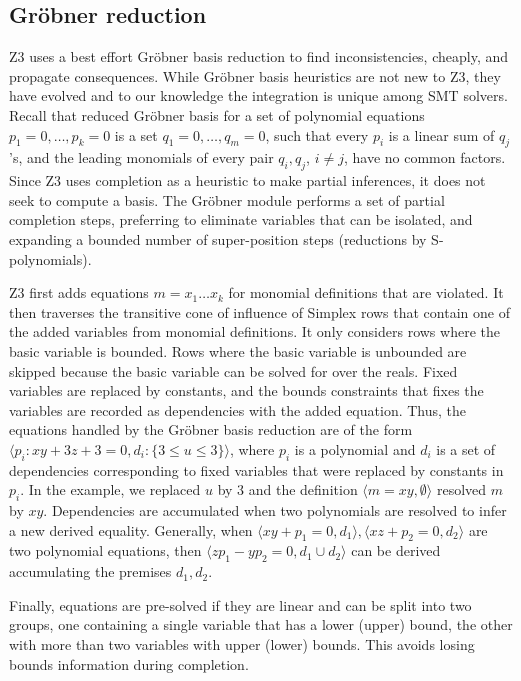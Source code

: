 \subsection{Gr{\"o}bner reduction}

Z3 uses a best effort Gr\"obner basis reduction to find inconsistencies, cheaply, 
and propagate consequences. While Gr{\"o}bner basis heuristics are not new to Z3,
they have evolved and to our knowledge the integration is unique among SMT solvers.
Recall that reduced Gr{\"o}bner basis for a set of polynomial equations $p_1 = 0, \ldots, p_k = 0$
is a set $q_1 = 0, \ldots, q_m = 0$, such that every $p_i$ is a linear sum of $q_j$'s,
and the leading monomials of every pair $q_i, q_j$, $i \neq j$, have no common factors.
Since Z3 uses completion as a heuristic to make partial inferences, it does not seek to compute
a basis.
The Gr\"obner module performs a set of partial completion steps, preferring
to eliminate variables that can be isolated, and expanding a bounded number of super-position
steps (reductions by S-polynomials).

Z3 first adds equations $m = x_1\ldots x_k$ for monomial definitions that are violated.
It then traverses the transitive cone of influence of Simplex rows that contain one of the added variables
from monomial definitions. It only considers rows where the basic variable is bounded.
Rows where the basic variable is unbounded are skipped
because the basic variable can be solved for over the reals.
Fixed variables are replaced by constants, and the bounds constraints that fixes the variables
are recorded as dependencies with the added equation. Thus, the equations handled by the
Gr{\"o}bner basis reduction are of the form $\langle p_i: xy + 3z + 3 = 0, d_i: \{3 \leq u \leq 3\} \rangle$, where $p_i$
is a polynomial and $d_i$ is a set of dependencies corresponding to fixed variables that were replaced
by constants in $p_i$. In the example, we replaced $u$ by $3$ and the definition $\langle m = xy, \emptyset\rangle$ resolved $m$ by $xy$.
Dependencies are accumulated when two polynomials are resolved to infer a new derived equality.
Generally, when $\langle xy + p_1 = 0, d_1\rangle, \langle xz + p_2 = 0, d_2 \rangle$ are two polynomial equations,
then $\langle zp_1 - yp_2 = 0, d_1 \cup d_2\rangle$ can be derived accumulating the premises $d_1, d_2$.

Finally, equations are pre-solved if they are linear and can be split
into two groups, one containing a single variable that has a
lower (upper) bound, the other with more than two variables
with upper (lower) bounds. This avoids losing bounds information
during completion.

